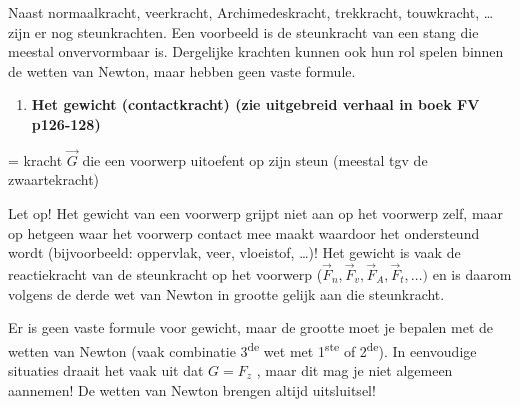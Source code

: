 \documentclass{ximera}
\begin{document}
Naast normaalkracht, veerkracht, Archimedeskracht, trekkracht,
touwkracht, \ldots{} zijn er nog steunkrachten. Een voorbeeld is de
steunkracht van een stang die meestal onvervormbaar is. Dergelijke
krachten kunnen ook hun rol spelen binnen de wetten van Newton, maar
hebben geen vaste formule.

\begin{enumerate}
\def\labelenumi{\arabic{enumi}.}
\setcounter{enumi}{9}
\item
  \textbf{Het gewicht (contactkracht) (zie uitgebreid verhaal in boek FV
  p126-128)}
\end{enumerate}

= kracht \(\overrightarrow{G}\) die een voorwerp uitoefent op zijn steun
(meestal tgv de zwaartekracht)

Let op! Het gewicht van een voorwerp grijpt niet aan op het voorwerp
zelf, maar op hetgeen waar het voorwerp contact mee maakt waardoor het
ondersteund wordt (bijvoorbeeld: oppervlak, veer, vloeistof, \ldots)!
Het gewicht is vaak de reactiekracht van de steunkracht op het voorwerp
(\({\overrightarrow{F}}_{n},{\overrightarrow{F}}_{v},{\overrightarrow{F}}_{A},{\overrightarrow{F}}_{t},\ldots)\)
en is daarom volgens de derde wet van Newton in grootte gelijk aan die
steunkracht.

Er is geen vaste formule voor gewicht, maar de grootte moet je bepalen
met de wetten van Newton (vaak combinatie 3\textsuperscript{de} wet met
1\textsuperscript{ste} of 2\textsuperscript{de}). In eenvoudige
situaties draait het vaak uit dat \(G = F_{z}\) , maar dit mag je niet
algemeen aannemen! De wetten van Newton brengen altijd uitsluitsel!
\end{document}
